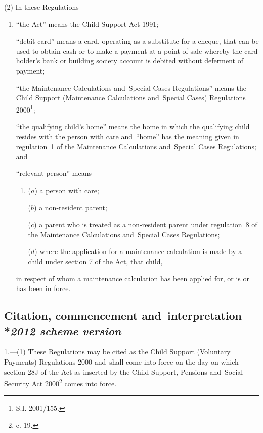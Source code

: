 \documentclass[12pt,a4paper]{article}
\begin{document}
(2) In these Regulations—
\begin{enumerate}\item[]
“the Act” means the Child Support Act 1991;

“debit card” means a card, operating as a substitute for a cheque, that can be used to obtain cash or to make a payment at a point of sale whereby the card holder’s bank or building society account is debited without deferment of payment;

“the Maintenance Calculations and~Special Cases Regulations” means the Child Support (Maintenance Calculations and~Special Cases) Regulations 2000\footnote{\frenchspacing S.I. 2001/155.};

“the qualifying child’s home” means the home in which the qualifying child resides with the person with care and~“home” has the meaning given in regulation~1 of the Maintenance Calculations and~Special Cases Regulations; and

“relevant person” means—
\begin{enumerate}\item[]
($a$) 
a person with care;

($b$) 
a non-resident parent;

($c$) 
a parent who is treated as a non-resident parent under regulation~8 of the Maintenance Calculations and~Special Cases Regulations;

($d$) 
where the application for a maintenance calculation is made by a child under section 7 of the Act, that child,
\end{enumerate}
in respect of whom a maintenance calculation has been applied for, 
or is or has been in force.
\end{enumerate}


\subsection[1. Citation, commencement and~interpretation --- \emph{2012 scheme version}]{Citation, commencement and~interpretation\\*\emph{2012 scheme version}}

1.---(1)  These Regulations may be cited as the Child Support (Voluntary Payments) Regulations 2000 and~shall come into force on the day on which section 28J of the Act as inserted by the Child Support, Pensions and~Social Security Act 2000\footnote{ c. 19.} comes into force.
\end{document}
